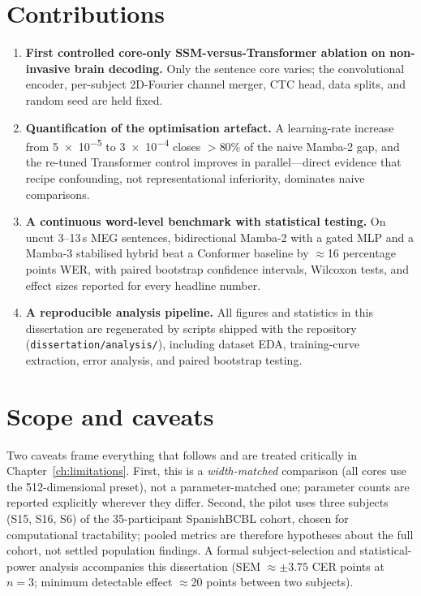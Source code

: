 \documentclass[11pt,a4paper]{report}
\begin{document}
\section{Contributions}
\begin{enumerate}
  \item \textbf{First controlled core-only SSM-versus-Transformer ablation on
  non-invasive brain decoding.} Only the sentence core varies; the
  convolutional encoder, per-subject 2D-Fourier channel merger, CTC head,
  data splits, and random seed are held fixed.
  \item \textbf{Quantification of the optimisation artefact.} A learning-rate
  increase from \num{5e-5} to \num{3e-4} closes $>$80\% of the naive Mamba-2
  gap, and the re-tuned Transformer control improves in parallel---direct
  evidence that recipe confounding, not representational inferiority,
  dominates naive comparisons.
  \item \textbf{A continuous word-level benchmark with statistical testing.}
  On uncut 3--13\,s MEG sentences, bidirectional Mamba-2 with a gated MLP and
  a Mamba-3 stabilised hybrid beat a Conformer baseline by $\approx$16
  percentage points WER, with paired bootstrap confidence intervals,
  Wilcoxon tests, and effect sizes reported for every headline number.
  \item \textbf{A reproducible analysis pipeline.} All figures and statistics
  in this dissertation are regenerated by scripts shipped with the
  repository (\texttt{dissertation/analysis/}), including dataset EDA,
  training-curve extraction, error analysis, and paired bootstrap testing.
\end{enumerate}

\section{Scope and caveats}
Two caveats frame everything that follows and are treated critically in
Chapter~\ref{ch:limitations}. First, this is a \emph{width-matched}
comparison (all cores use the 512-dimensional preset), not a
parameter-matched one; parameter counts are reported explicitly wherever
they differ. Second, the pilot uses three subjects (S15, S16, S6) of the
35-participant SpanishBCBL cohort, chosen for computational tractability;
pooled metrics are therefore hypotheses about the full cohort, not settled
population findings. A formal subject-selection and statistical-power
analysis accompanies this dissertation (SEM $\approx\pm3.75$ CER points at
$n=3$; minimum detectable effect $\approx$20 points between two subjects).
\end{document}
